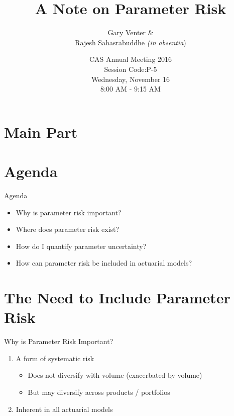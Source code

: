 \documentclass[10pt, xcolor=x11names,compress]{beamer}
\title{A Note on Parameter Risk}
\subtitle{Gary Venter \& \\
	Rajesh Sahasrabuddhe \textit{(in absentia})}
\date{
	CAS Annual Meeting 2016\\
	Session Code:P-5\\
	Wednesday, November 16\\
	8:00 AM - 9:15 AM	
	}
\begin{document}
\section{Main Part}
\begin{frame}
\maketitle
\end{frame}

\section{Agenda}
\begin{frame}{Agenda}
\begin{itemize}
	\item<1-> Why is parameter risk important?
	\item<2-> Where does parameter risk exist?
	\item<3-> How do I quantify parameter uncertainty?
	\item<4-> How can parameter risk be included in actuarial models?		
\end{itemize}
\end{frame}

\section{The Need to Include Parameter Risk}
\begin{frame}{Why is Parameter Risk Important?}
	\begin{enumerate}
		\item<1-> A form of systematic risk
		\begin{itemize}
			\item<2-> Does not diversify with volume (exacerbated by volume)
			\item<2-> But may diversify across products / portfolios
		\end{itemize}
		\item<3-> Inherent in all actuarial models		
	\end{enumerate}
\end{frame}
\end{document}

